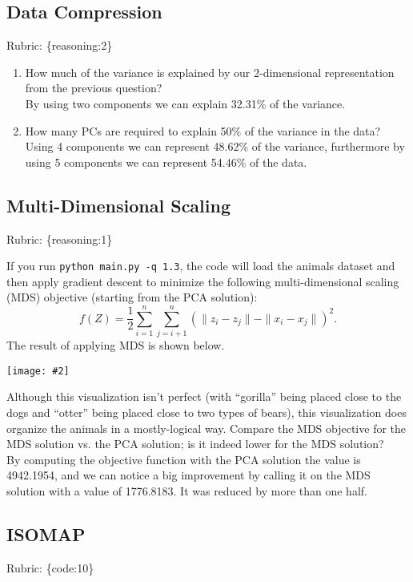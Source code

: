 \documentclass{article}
\def\rubric#1{\gre{Rubric: \{#1\}}}{}
\def\blu#1{{\color{blu}#1}}
\def\gre#1{{\color{gre}#1}}
\def\ans#1{{\color{ans}#1}}
\def\norm#1{\|#1\|}
\newcommand{\centerfig}[2]{\begin{center}\texttt{[image: \#2]}\end{center}}
\def\enum#1{\begin{enumerate}#1\end{enumerate}}
\begin{document}
\subsection{Data Compression}
\rubric{reasoning:2}

\blu{\enum{
\item How much of the variance is explained by our 2-dimensional representation from the previous question? \\
\ans{
    By using two components we can explain 32.31\% of the variance.
}
\item How many PCs are required to explain 50\% of the variance in the data? \\
\ans{
    Using 4 components we can represent 48.62\% of the variance, furthermore by using 5 components
    we can represent 54.46\% of the data.
}
}}


\subsection{Multi-Dimensional Scaling}
\rubric{reasoning:1}

If you run \verb|python main.py -q 1.3|, the code will load the animals dataset and then apply gradient descent to minimize the following multi-dimensional scaling (MDS) objective (starting from the PCA solution):
\begin{equation}
\label{eq:MDS}
f(Z) =  \frac{1}{2}\sum_{i=1}^n\sum_{j=i+1}^n (  \norm{z_i - z_j} - \norm{x_i - x_j})^2.
\end{equation}
 The result of applying MDS is shown below.
\centerfig{.5}{../figs/MDS_animals.png}
Although this visualization isn't perfect (with ``gorilla'' being placed close to the dogs and ``otter'' being placed close to two types of bears), this visualization does organize the animals in a mostly-logical way.
\blu{Compare the MDS objective for the MDS solution vs. the PCA solution; is it indeed lower for the MDS solution?}  \\
\ans{
    By computing the objective function with the PCA solution the value is 4942.1954, and we can notice a big improvement 
    by calling it on the MDS solution with a value of 1776.8183. It was reduced by more than one half.
}
\subsection{ISOMAP}
\rubric{code:10}
\end{document}
